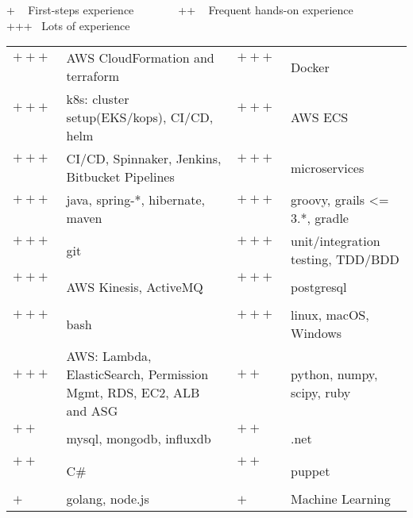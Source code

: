 
\newcommand{\plus}{$+~$~~~~}
\newcommand{\pplus}{$++~$~~~~}
\newcommand{\ppplus}{$+++$~~~~~}
\begin{cventries}
\cventry
{+ ~ First-steps experience ~~~  ~~~ ++ ~ Frequent hands-on experience ~~~  ~~~ +++ ~Lots of experience \vspace{0.1em}} %
{} %
{} %
{} %
{ %
\hspace{1em}
\setlength{\tabcolsep}{3pt}
\begin{tabular}{  l l @{\hskip 3mm} l l }
		   \ppplus & AWS CloudFormation and terraform &  \ppplus & Docker\\
		   \ppplus & k8s: cluster setup(EKS/kops), CI/CD, helm & \ppplus & AWS ECS\\
		   \ppplus & CI/CD, Spinnaker, Jenkins, Bitbucket Pipelines & \ppplus & microservices \\
           \ppplus & java, spring-*, hibernate, maven  & \ppplus & groovy, grails <= 3.*, gradle \\ 
           \ppplus & git & \ppplus & unit/integration testing, TDD/BDD   \\
		   \ppplus & AWS Kinesis, ActiveMQ & \ppplus & postgresql\\
           \ppplus & bash\vspace{0.7em} & \ppplus & linux, macOS, Windows\\ 
           \ppplus & AWS: Lambda, ElasticSearch, Permission Mgmt, RDS, EC2, ALB and ASG & \pplus &python, numpy, scipy, ruby \\ 
           \pplus & mysql, mongodb, influxdb  & \pplus & .net  \\
           \pplus & C\# & \pplus & puppet \\
           \plus & golang, node.js & \plus & Machine Learning 
\end{tabular}
}
\end{cventries}

